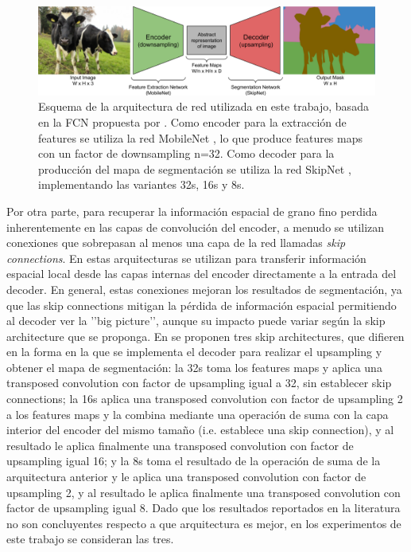 \documentclass[a4paper,authoryear,review]{elsarticle}
\begin{document}
\begin{figure}
	\centering
	\includegraphics[width=12cm]{figures/FCN.png}
	\caption{Esquema de la arquitectura de red utilizada en este trabajo, basada en la FCN propuesta por \citet{shelhamer2017fully}. Como encoder para la extracción de features se utiliza la red MobileNet \cite{howard2017mobilenets}, lo que produce features maps con un factor de downsampling n=32. Como decoder para la producción  del mapa de segmentación se utiliza la red SkipNet \cite{siam2018rtseg}, implementando las variantes 32s, 16s y 8s.}
	\label{fig:FiguraX}
\end{figure}

Por otra parte, para recuperar la información espacial de grano fino perdida inherentemente en las capas de convolución del encoder, a menudo se utilizan conexiones que sobrepasan al menos una capa de la red llamadas \emph{skip connections}. En estas arquitecturas se utilizan para transferir información espacial local desde las capas internas del encoder directamente a la entrada del decoder. En general, estas conexiones mejoran los resultados de segmentación, ya que las skip connections mitigan la pérdida de información espacial permitiendo al decoder ver la ’’big picture’’, aunque su impacto puede variar según la skip architecture que se proponga. En \citep{long2015fully, shelhamer2017fully} se proponen tres skip architectures, que difieren en la forma en la que se implementa el decoder para realizar el upsampling y obtener el mapa de segmentación: la 32s toma los features maps y aplica una transposed convolution con factor de upsampling igual a 32, sin establecer skip connections; la 16s aplica una transposed convolution con factor de upsampling 2 a los features maps y la combina mediante una operación de suma con la capa interior del encoder del mismo tamaño (i.e. establece una skip connection), y al resultado le aplica finalmente una transposed convolution con factor de upsampling igual 16; y la 8s toma el resultado de la operación de suma de la arquitectura anterior y le aplica una transposed convolution con factor de upsampling 2, y al resultado le aplica finalmente una transposed convolution con factor de upsampling igual 8. Dado que los resultados reportados en la literatura no son concluyentes respecto a que arquitectura es mejor, en los experimentos de este trabajo se consideran las tres.
\end{document}

